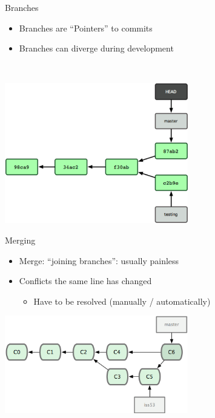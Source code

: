 \documentclass[10pt,xcolor=dvipsnames]{beamer}
\begin{document}
\begin{frame}{Branches}
\begin{itemize}
\item Branches are ``Pointers'' to commits
\item Branches can diverge during development
\end{itemize}
~\\[0.1in]
\begin{center}
\includegraphics[width = 0.6\textwidth]{branch2.png}
\end{center}
\end{frame}

\begin{frame}{Merging}
\begin{center}
\begin{itemize}
\item Merge: ``joining branches'': usually painless
\item Conflicts the same line has changed 
\begin{itemize}
\item Have to be resolved (manually / automatically)
\end{itemize}
\end{itemize}
\includegraphics[width = 0.6\textwidth]{branchmerge.png}
\end{center}
\end{frame}
\end{document}
